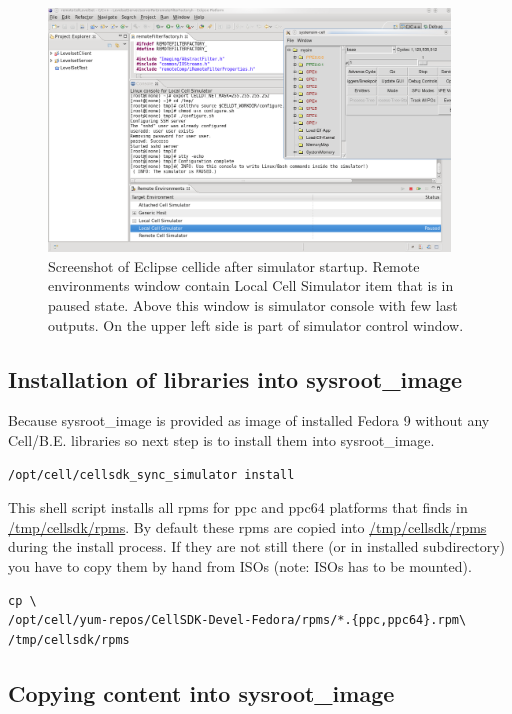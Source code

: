 \begin{figure}
    \centering
    \includegraphics[width=0.95\textwidth]{data/png/eclipseSIMStarted}
    \caption[Cellide with started simulator]{Screenshot of Eclipse cellide after simulator startup. Remote environments window contain Local Cell Simulator item that is in paused state. Above this window is simulator console with few last outputs. On the upper left side is part of simulator control window.}
    \label{fg:eclipseSIMStarted}
\end{figure}

\subsection{Installation of libraries into sysroot\_image}

Because sysroot\_image is provided as image of installed Fedora 9 without any Cell/B.E. libraries so next step is to install them into sysroot\_image.

\begin{verbatim}
/opt/cell/cellsdk_sync_simulator install
\end{verbatim}

This shell script installs all rpms for ppc and ppc64 platforms that finds in \url{/tmp/cellsdk/rpms}.
By default these rpms are copied into \url{/tmp/cellsdk/rpms} during the install process.
If they are not still there (or in installed subdirectory) you have to copy them by hand from ISOs (note: ISOs has to be mounted).

\begin{verbatim}
cp \
/opt/cell/yum-repos/CellSDK-Devel-Fedora/rpms/*.{ppc,ppc64}.rpm\
/tmp/cellsdk/rpms
\end{verbatim}

\subsection{Copying content into sysroot\_image}

